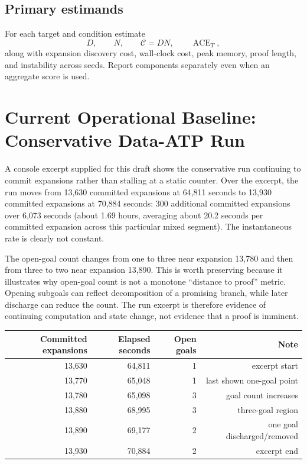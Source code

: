 \documentclass[11pt]{article}
\theoremstyle{datatheorem}
\theoremstyle{definition}
\newcommand{\cY}{\mathcal{C}}
\begin{document}
\subsection{Primary estimands}

For each target and condition estimate
\[
D,\qquad N,\qquad \cY=DN,\qquad \operatorname{ACE}_T,
\]
along with expansion discovery cost, wall-clock cost, peak memory, proof length, and instability across seeds. Report components separately even when an aggregate score is used.

\section{Current Operational Baseline: Conservative Data-ATP Run}

A console excerpt supplied for this draft shows the conservative run continuing to commit expansions rather than stalling at a static counter. Over the excerpt, the run moves from 13,630 committed expansions at 64,811 seconds to 13,930 committed expansions at 70,884 seconds: 300 additional committed expansions over 6,073 seconds (about 1.69 hours, averaging about 20.2 seconds per committed expansion across this particular mixed segment). The instantaneous rate is clearly not constant.

The open-goal count changes from one to three near expansion 13,780 and then from three to two near expansion 13,890. This is worth preserving because it illustrates why open-goal count is not a monotone ``distance to proof'' metric. Opening subgoals can reflect decomposition of a promising branch, while later discharge can reduce the count. The run excerpt is therefore evidence of continuing computation and state change, not evidence that a proof is imminent.

\begin{center}
\begin{tabular}{@{}rrrr@{}}
\toprule
Committed expansions & Elapsed seconds & Open goals & Note\\
\midrule
13,630 & 64,811 & 1 & excerpt start\\
13,770 & 65,048 & 1 & last shown one-goal point\\
13,780 & 65,098 & 3 & goal count increases\\
13,880 & 68,995 & 3 & three-goal region\\
13,890 & 69,177 & 2 & one goal discharged/removed\\
13,930 & 70,884 & 2 & excerpt end\\
\bottomrule
\end{tabular}
\end{center}
\end{document}
